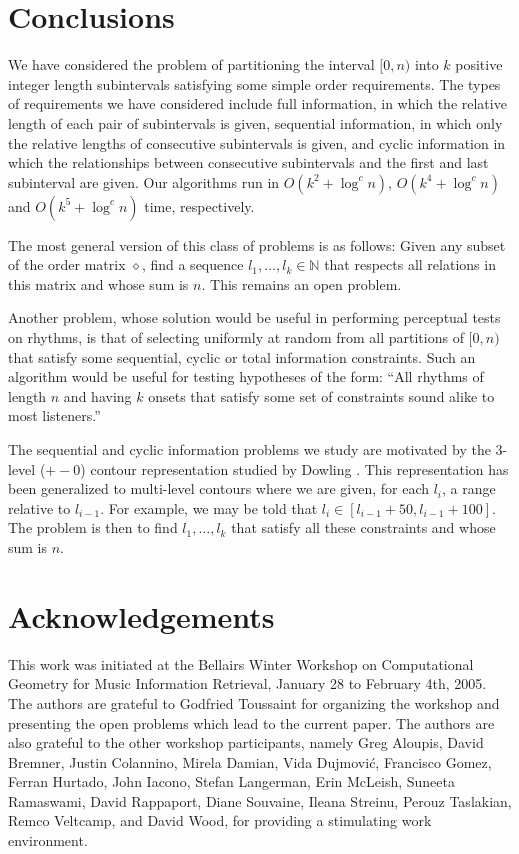 \documentclass[11pt,a4paper]{article}
\newcommand{\N}{\mathbb{N}}
\newcommand{\op}{\diamond}
\begin{document}
\section{Conclusions}

We have considered the problem of partitioning the interval $[0,n)$
into $k$ positive integer length subintervals satisfying some simple
order requirements.  The types of requirements we have considered
include full information, in which the relative length of each pair of
subintervals is given, sequential information, in which only the
relative lengths of consecutive subintervals is given, and cyclic
information in which the relationships between consecutive
subintervals and the first and last subinterval are given.  Our
algorithms run in $O(k^2+\log^c n)$, $O(k^4+\log^c n)$ and
$O(k^5+\log^cn)$ time, respectively.

The most general version of this class of problems is as follows:
Given any subset of the order matrix $\op$, find a sequence
$l_1,\ldots,l_k\in\N$ that respects all relations in this matrix and
whose sum is $n$. This remains an open problem.

Another problem, whose solution would be useful in performing
perceptual tests on rhythms, is that of selecting uniformly at random
from all partitions of $[0,n)$ that satisfy some sequential, cyclic or
total information constraints.  Such an algorithm would be useful for
testing hypotheses of the form:  ``All rhythms of length $n$ and
having $k$ onsets that satisfy some set of constraints sound alike to
most listeners.''

The sequential and cyclic information problems we study are motivated
by the 3-level ($+-0$) contour representation studied by Dowling
\cite{d78}.  This representation has been generalized to multi-level
contours \cite{l96,kcgv00} where we are given, for each $l_i$, a range
relative to $l_{i-1}$.  For example, we may be told that $l_{i}\in
[l_{i-1} + 50, l_{i-1}+100]$.  The problem is then to find
$l_1,\ldots,l_k$ that satisfy all these constraints and whose sum is
$n$.

\section*{Acknowledgements}

This work was initiated at the Bellairs Winter Workshop on
Computational Geometry for Music Information Retrieval, January 28 to
February 4th, 2005.  The authors are grateful to Godfried Toussaint
for organizing the workshop and presenting the open problems which
lead to the current paper.  The authors are also grateful to the other
workshop participants, namely 
Greg Aloupis,
David Bremner,
Justin Colannino,
Mirela Damian, 
Vida Dujmovi\'c,
Francisco Gomez,
Ferran Hurtado, 
John Iacono,
Stefan Langerman,
Erin McLeish,
Suneeta Ramaswami,
David Rappaport,
Diane Souvaine,
Ileana Streinu,
Perouz Taslakian,
Remco Veltcamp,
and David Wood,
for providing a
stimulating work environment.



\end{document}
